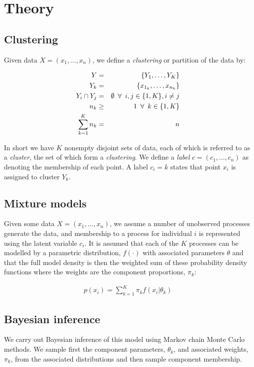 \documentclass[12pt]{article} %
\begin{document}
	\section{Theory}
	\subsection{Clustering} \label{sec:clustering}
	Given data $X=\left(x_1,\ldots,x_n\right)$, we define a \emph{clustering} or partition of the data by:
	
	\begin{eqnarray}
	Y &=& \left\{Y_1,\ldots,Y_K\right\} \\
	Y_k &=& \left\{x_{1_k},\ldots, x_{n_k}\right\}  \\
	Y_i \cap Y_j &=& \emptyset \enskip \forall \enskip i,j \in \{1,K\}, i \neq j \\
	n_k & \geq & 1 \enskip \forall \enskip k \in \{1,K\} \\
	\sum_{k=1}^Kn_k &=& n
	\end{eqnarray}
	
	In short we have $K$ nonempty disjoint sets of data, each of which is referred to as a \emph{cluster}, the set of which form a \emph{clustering}. We define a \emph{label} $c=(c_1,\ldots,c_n)$ as denoting the membership of each point. A label $c_i=k$ states that point $x_i$ is assigned to cluster $Y_k$.
	
	\subsection{Mixture models} \label{mixture_models}
	Given some data $X = (x_1, \ldots, x_n)$, we assume a number of unobserved processes generate the data, and membership to a process for individual $i$ is represented using the latent variable $c_i$. It is assumed that each of the $K$ processes can be modelled by a parametric distribution, $f(\cdot)$ with associated parameters $\theta$ and that the full model density is then the weighted sum of these probability density functions where the weights are the component proportions, $\pi_k$:
	
	\begin{align}
	p(x_i) = \sum_{k=1}^K \pi_k f(x_i | \theta_k)
	\end{align}
	
	\subsection{Bayesian inference}	
	We carry out Bayesian inference of this model using Markov chain Monte Carlo methods. We sample first the component parameters, $\theta_k$, and associated weights, $\pi_k$, from the associated distributions and then sample component membership.
	
\end{document}
